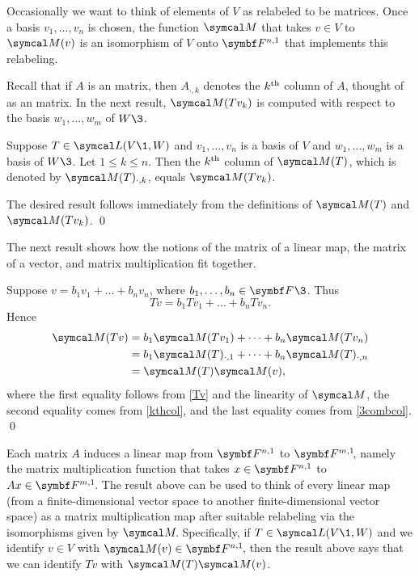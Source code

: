 Occasionally we want to think of elements of $V$ as relabeled to be  matrices. Once a basis $v_1, \dots, v_n$ is chosen, the function $\M$ that takes $v \in V$ to $\M(v)$ is an isomorphism of $V$ onto $\F{n,1}$ that implements this relabeling.

Recall that if $A$ is an   matrix, then $A_{\cdot, k}$ denotes the $k^{\text{{th}}}$ column of $A$, thought of as an  matrix. In the next result, $\M(Tv_k)$ is computed with respect to the basis $w_1, \dots, w_m$ of $W\3$.

{Suppose $T \in \L(V\1, W)$ and $v_1, \dots, v_n$ is a basis of $V$ and $w_1, \dots, w_m$ is a basis of $W\3$. Let $1 \le k \le n$. Then the $k^{\text{{th}}}$ column of $\M(T)$, which is denoted by $\M(T)_{\cdot, k}$, equals $\M(Tv_k)$.}

\proof
The desired result follows immediately from the definitions of $\M(T)$ and $\M(Tv_k)$. \qed

The next result shows how the notions of the matrix of a linear map, the matrix
of a vector, and matrix multiplication fit together.


\proof
Suppose $v = b_1 v_1 + \dots + b_n v_n$, where $b_1, \dots, b_n \in \F{}\3$. Thus
\begin{equation} \label{Tv}
Tv = b_1 Tv_1 + \dots + b_n Tv_n.
\end{equation}%
Hence
\begin{align*}
\M(Tv) &= b_1 \M(Tv_1) + \dots + b_n \M(Tv_n) \\
&= b_1 \M(T)_{\cdot, 1} + \dots + b_n \M(T)_{\cdot, n} \\
&= \M(T) \M(v),
\end{align*}
where the first equality follows from \ref{Tv} and the linearity of $\M$, the second equality comes from \ref{kthcol},
and the last equality comes from \ref{3combcol}.
\qed

Each  matrix $A$ induces a linear map from $\F{n,1}$ to $\FF{m,1}$, namely the matrix multiplication function that takes $x \in \F{n,1}$ to $Ax \in \FF{m,1}$. The result above can be used to think of every linear map (from a finite-dimensional vector space to another finite-dimensional vector space) as a matrix multiplication map after suitable relabeling via the isomorphisms given by $\M\!$. Specifically, if \mbox{$T \in \L(V\1,W)$} and we identify $v \in V$ with $\M(v) \in \FF{n,1}$, then the result above says that we can identify $Tv$ with $\M(T)\M(v)$.

